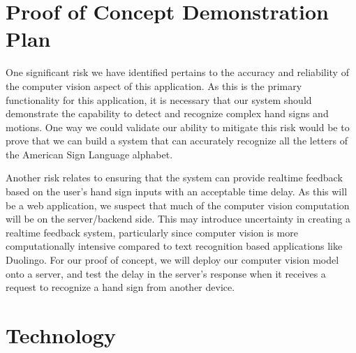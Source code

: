 \documentclass{article}
\begin{document}
\section{Proof of Concept Demonstration Plan}

One significant risk we have identified pertains to the accuracy and reliability of the computer vision aspect of this application. As this is the primary functionality for this application, it is necessary that our system should demonstrate the capability to detect and recognize complex hand signs and motions. One way we could validate our ability to mitigate this risk would be to prove that we can build a system that can accurately recognize all the letters of the American Sign Language alphabet.

Another risk relates to ensuring that the system can provide realtime feedback based on the user's hand sign inputs with an acceptable time delay. As this will be a web application, we suspect that much of the computer vision computation will be on the server/backend side. This may introduce uncertainty in creating a realtime feedback system, particularly since computer vision is more computationally intensive compared to text recognition based applications like Duolingo. For our proof of concept, we will deploy our computer vision model onto a server, and test the delay in the server's response when it receives a request to recognize a hand sign from another device.

\section{Technology}
\end{document}

